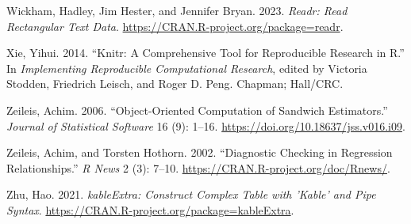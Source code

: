 \documentclass[
]{article}
\newlength{\cslhangindent}
\newlength{\cslentryspacingunit} %
\newenvironment{CSLReferences}[2] %
 {%
  \setlength{\parindent}{0pt}
  \ifodd #1
  \let\oldpar\par
  \def\par{\hangindent=\cslhangindent\oldpar}
  \fi
  \setlength{\parskip}{#2\cslentryspacingunit}
 }%
 {}
\begin{document}
\begin{CSLReferences}{1}{0}
\leavevmode{}%
Wickham, Hadley, Jim Hester, and Jennifer Bryan. 2023. \emph{Readr: Read
Rectangular Text Data}. \url{https://CRAN.R-project.org/package=readr}.

\leavevmode{}%
Xie, Yihui. 2014. {``Knitr: A Comprehensive Tool for Reproducible
Research in {R}.''} In \emph{Implementing Reproducible Computational
Research}, edited by Victoria Stodden, Friedrich Leisch, and Roger D.
Peng. Chapman; Hall/CRC.

\leavevmode{}%
Zeileis, Achim. 2006. {``Object-Oriented Computation of Sandwich
Estimators.''} \emph{Journal of Statistical Software} 16 (9): 1--16.
\url{https://doi.org/10.18637/jss.v016.i09}.

\leavevmode{}%
Zeileis, Achim, and Torsten Hothorn. 2002. {``Diagnostic Checking in
Regression Relationships.''} \emph{R News} 2 (3): 7--10.
\url{https://CRAN.R-project.org/doc/Rnews/}.

\leavevmode{}%
Zhu, Hao. 2021. \emph{kableExtra: Construct Complex Table with 'Kable'
and Pipe Syntax}. \url{https://CRAN.R-project.org/package=kableExtra}.

\end{CSLReferences}
\end{document}
